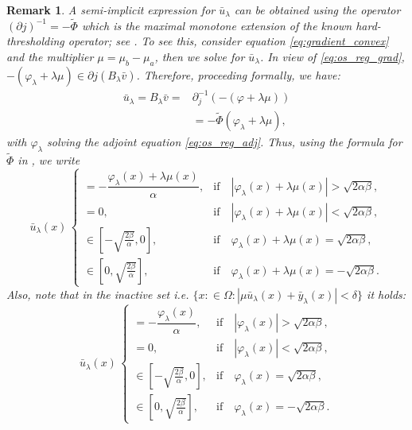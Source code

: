 \documentclass[11pt,a4paper]{amsart}
\newcommand{\om}{\Omega}
\newtheorem{remark}{{Remark}}
\begin{document}
\begin{remark}
A semi-implicit expression for $\bar u_\lambda$ can be obtained using the operator $ (\partial j)^{-1}=-\tilde\Phi$ which is the maximal monotone extension of the known hard-thresholding operator; see \cite{itokun2014}. To see this, consider equation \eqref{eq:gradient_convex} and the multiplier $\mu = \mu_b-\mu_a$, then we solve for $\bar u_\lambda$. In view of \eqref{eq:os_reg_grad}, $-(\varphi_\lambda+\lambda \mu) \in \partial j(B_\lambda \bar v)$. Therefore, proceeding formally, we have:
\begin{align*}
    \bar u_\lambda = B_\lambda \bar v =& \partial_{j}^{-1} ( -(\varphi +\lambda \mu )) \\
    &=-\tilde\Phi (\varphi_\lambda + \lambda\mu),
\end{align*}
with $\varphi_\lambda$ solving the adjoint equation \eqref{eq:os_reg_adj}. Thus, using the formula for $\tilde \Phi$ in \cite[pg. 1257]{itokun2014}, we write
\begin{equation}\label{eq:optimal_u}
\bar u_\lambda(x) \,
\begin{cases}
=-\dfrac{\varphi_\lambda(x) + \lambda \mu(x)}{\alpha}, & \text{if}\quad  |\varphi_\lambda(x) + \lambda \mu(x)| > \sqrt{2\alpha\beta}, \\
=0,  & \text{if}\quad  |\varphi_\lambda(x) + \lambda \mu(x)| < \sqrt{2\alpha\beta}, \\
\in [-\sqrt{\frac{2\beta}{\alpha}},0],  & \text{if}\quad  \varphi_\lambda(x) + \lambda \mu(x) = \sqrt{2\alpha\beta}, \\
\in [0,\sqrt{\frac{2\beta}{\alpha}}], & \text{if}\quad  \varphi_\lambda(x) + \lambda \mu(x) = -\sqrt{2\alpha\beta}.
\end{cases}
\end{equation}
Also, note that in the inactive set i.e. $\{x:\in\om: |\mu \bar u_\lambda (x) + \bar y_\lambda(x)| <\delta\}$ it holds: 
\begin{equation}\label{eq:optimal_u_ina}
\bar u_\lambda(x) \,
\begin{cases}
=-\dfrac{\varphi_\lambda(x)}{\alpha}, & \text{if}\quad  |\varphi_\lambda(x)| > \sqrt{2\alpha\beta}, \\
=0,  & \text{if}\quad  |\varphi_\lambda(x)| < \sqrt{2\alpha\beta}, \\
\in [-\sqrt{\frac{2\beta}{\alpha}},0],  & \text{if}\quad  \varphi_\lambda(x) = \sqrt{2\alpha\beta}, \\
\in [0,\sqrt{\frac{2\beta}{\alpha}}], & \text{if}\quad  \varphi_\lambda(x)  = -\sqrt{2\alpha\beta}.
\end{cases}
\end{equation}
\end{remark}
\end{document}
